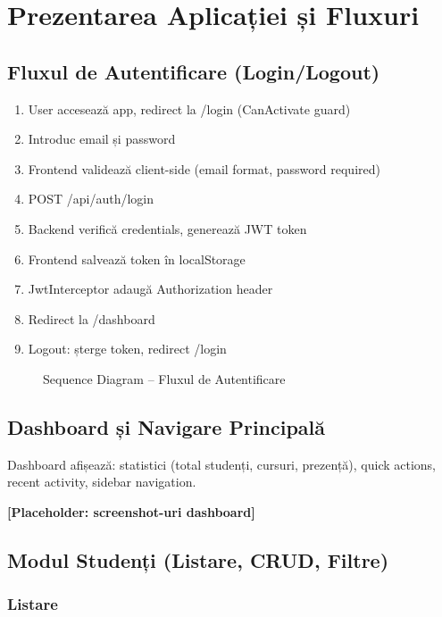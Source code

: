 \chapter{Prezentarea Aplicației și Fluxuri}
\label{cap:prezentare}

\section{Fluxul de Autentificare (Login/Logout)}

\begin{enumerate}
  \item User accesează app, redirect la /login (CanActivate guard)
  \item Introduc email și password
  \item Frontend validează client-side (email format, password required)
  \item POST /api/auth/login
  \item Backend verifică credentials, generează JWT token
  \item Frontend salvează token în localStorage
  \item JwtInterceptor adaugă Authorization header
  \item Redirect la /dashboard
  \item Logout: șterge token, redirect /login
\end{enumerate}

\begin{figure}[H]
  \centering
  \caption{Sequence Diagram – Fluxul de Autentificare}
  \label{fig:login}
\end{figure}

\section{Dashboard și Navigare Principală}

Dashboard afișează: statistici (total studenți, cursuri, prezență), quick actions, recent activity, sidebar navigation.

\textbf{[Placeholder: screenshot-uri dashboard]}

\section{Modul Studenți (Listare, CRUD, Filtre)}

\subsection{Listare}

